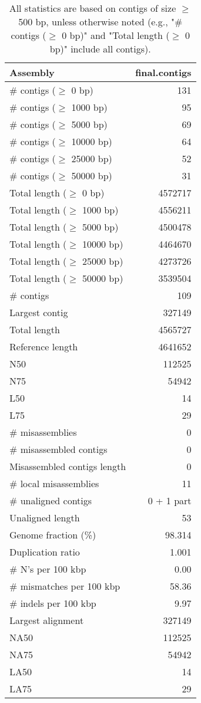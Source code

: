 \documentclass[12pt,a4paper]{article}
\begin{document}
\begin{table}[ht]
\begin{center}
\caption{All statistics are based on contigs of size $\geq$ 500 bp, unless otherwise noted (e.g., "\# contigs ($\geq$ 0 bp)" and "Total length ($\geq$ 0 bp)" include all contigs).}
\begin{tabular}{|l*{1}{|r}|}
\hline
Assembly & final.contigs \\ \hline
\# contigs ($\geq$ 0 bp) & 131 \\ \hline
\# contigs ($\geq$ 1000 bp) & 95 \\ \hline
\# contigs ($\geq$ 5000 bp) & 69 \\ \hline
\# contigs ($\geq$ 10000 bp) & 64 \\ \hline
\# contigs ($\geq$ 25000 bp) & 52 \\ \hline
\# contigs ($\geq$ 50000 bp) & 31 \\ \hline
Total length ($\geq$ 0 bp) & 4572717 \\ \hline
Total length ($\geq$ 1000 bp) & 4556211 \\ \hline
Total length ($\geq$ 5000 bp) & 4500478 \\ \hline
Total length ($\geq$ 10000 bp) & 4464670 \\ \hline
Total length ($\geq$ 25000 bp) & 4273726 \\ \hline
Total length ($\geq$ 50000 bp) & 3539504 \\ \hline
\# contigs & 109 \\ \hline
Largest contig & 327149 \\ \hline
Total length & 4565727 \\ \hline
Reference length & 4641652 \\ \hline
N50 & 112525 \\ \hline
N75 & 54942 \\ \hline
L50 & 14 \\ \hline
L75 & 29 \\ \hline
\# misassemblies & 0 \\ \hline
\# misassembled contigs & 0 \\ \hline
Misassembled contigs length & 0 \\ \hline
\# local misassemblies & 11 \\ \hline
\# unaligned contigs & 0 + 1 part \\ \hline
Unaligned length & 53 \\ \hline
Genome fraction (\%) & 98.314 \\ \hline
Duplication ratio & 1.001 \\ \hline
\# N's per 100 kbp & 0.00 \\ \hline
\# mismatches per 100 kbp & 58.36 \\ \hline
\# indels per 100 kbp & 9.97 \\ \hline
Largest alignment & 327149 \\ \hline
NA50 & 112525 \\ \hline
NA75 & 54942 \\ \hline
LA50 & 14 \\ \hline
LA75 & 29 \\ \hline
\end{tabular}
\end{center}
\end{table}
\end{document}
